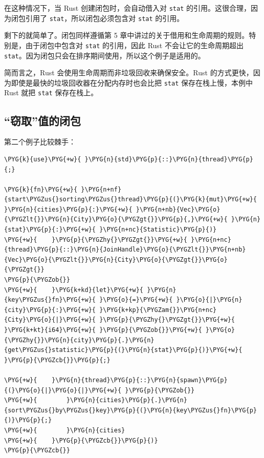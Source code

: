 在这种情况下，当 Rust 创建闭包时，会自动借入对 \texttt{stat} 的引用。这很合理，因为闭包引用了 \texttt{stat}，所以闭包必须包含对 \texttt{stat} 的引用。

剩下的就简单了。闭包同样遵循第 5 章中讲过的关于借用和生命周期的规则。特别是，由于闭包中包含对 \texttt{stat} 的引用，因此 Rust 不会让它的生命周期超出 \texttt{stat}。因为闭包只会在排序期间使用，所以这个例子是适用的。

简而言之，Rust 会使用生命周期而非垃圾回收来确保安全。Rust 的方式更快，因为即使是最快的垃圾回收器在分配内存时也会比把 \texttt{stat} 保存在栈上慢，本例中 Rust 就把 \texttt{stat} 保存在栈上。

\subsection{“窃取”值的闭包}

第二个例子比较棘手：

\begin{Verbatim}[commandchars=\\\{\},breaklines=true,breakanywhere=true,fontsize=\codefont,xleftmargin=17bp]
\PYG{k}{use}\PYG{+w}{ }\PYG{n}{std}\PYG{p}{::}\PYG{n}{thread}\PYG{p}{;}

\PYG{k}{fn}\PYG{+w}{ }\PYG{n+nf}{start\PYGZus{}sorting\PYGZus{}thread}\PYG{p}{(}\PYG{k}{mut}\PYG{+w}{ }\PYG{n}{cities}\PYG{p}{:}\PYG{+w}{ }\PYG{n+nb}{Vec}\PYG{o}{\PYGZlt{}}\PYG{n}{City}\PYG{o}{\PYGZgt{}}\PYG{p}{,}\PYG{+w}{ }\PYG{n}{stat}\PYG{p}{:}\PYG{+w}{ }\PYG{n+nc}{Statistic}\PYG{p}{)}
\PYG{+w}{    }\PYG{p}{\PYGZhy{}\PYGZgt{}}\PYG{+w}{ }\PYG{n+nc}{thread}\PYG{p}{::}\PYG{n}{JoinHandle}\PYG{o}{\PYGZlt{}}\PYG{n+nb}{Vec}\PYG{o}{\PYGZlt{}}\PYG{n}{City}\PYG{o}{\PYGZgt{}}\PYG{o}{\PYGZgt{}}
\PYG{p}{\PYGZob{}}
\PYG{+w}{    }\PYG{k+kd}{let}\PYG{+w}{ }\PYG{n}{key\PYGZus{}fn}\PYG{+w}{ }\PYG{o}{=}\PYG{+w}{ }\PYG{o}{|}\PYG{n}{city}\PYG{p}{:}\PYG{+w}{ }\PYG{k+kp}{\PYGZam{}}\PYG{n+nc}{City}\PYG{o}{|}\PYG{+w}{ }\PYG{p}{\PYGZhy{}\PYGZgt{}}\PYG{+w}{ }\PYG{k+kt}{i64}\PYG{+w}{ }\PYG{p}{\PYGZob{}}\PYG{+w}{ }\PYG{o}{\PYGZhy{}}\PYG{n}{city}\PYG{p}{.}\PYG{n}{get\PYGZus{}statistic}\PYG{p}{(}\PYG{n}{stat}\PYG{p}{)}\PYG{+w}{ }\PYG{p}{\PYGZcb{}}\PYG{p}{;}

\PYG{+w}{    }\PYG{n}{thread}\PYG{p}{::}\PYG{n}{spawn}\PYG{p}{(}\PYG{o}{|}\PYG{o}{|}\PYG{+w}{ }\PYG{p}{\PYGZob{}}
\PYG{+w}{        }\PYG{n}{cities}\PYG{p}{.}\PYG{n}{sort\PYGZus{}by\PYGZus{}key}\PYG{p}{(}\PYG{n}{key\PYGZus{}fn}\PYG{p}{)}\PYG{p}{;}
\PYG{+w}{        }\PYG{n}{cities}
\PYG{+w}{    }\PYG{p}{\PYGZcb{}}\PYG{p}{)}
\PYG{p}{\PYGZcb{}}
\end{Verbatim}

